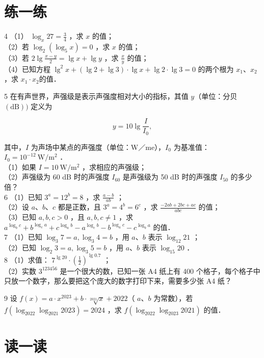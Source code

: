 \documentclass[10pt]{article}
\begin{document}
\section*{练一练}
4 （1） \(\log _{x} 27=\frac{3}{4}\) ，求 \(x\) 的值；\\
（2）若 \(\log _{2}\left(\log _{5} x\right)=0\) ，求 \(x\) 的值；\\
（3）若 \(2 \lg \frac{x-y}{2}=\lg x+\lg y\) ，求 \(\frac{x}{y}\) 的值；\\
（4）已知方程 \(\lg ^{2} x+(\lg 2+\lg 3) \cdot \lg x+\lg 2 \cdot \lg 3=0\) 的两个根为 \(x_{1} 、 x_{2}\) ，求 \(x_{1} \cdot x_{2}\)的值．

5 在有声世界，声强级是表示声强度相对大小的指标，其值 \(y\)（单位：分贝 \((\mathrm{dB}))\) 定义为

\[
y=10 \lg \frac{I}{I_{0}},
\]

其中，\(I\) 为声场中某点的声强度（单位：W／me），\(I_{0}\) 为基准值：\(I_{0}=10^{-12} \mathrm{~W} / \mathrm{m}^{2}\) ．\\
（1）如果 \(I=10 \mathrm{~W} / \mathrm{m}^{2}\) ，求相应的声强级；\\
（2）声强级为 60 dB 时的声强度 \(I_{60}\) 是声强级为 50 dB 时的声强度 \(I_{50}\) 的多少倍？\\
6 （1）已知 \(3^{a}=12^{b}=8\) ，求 \(\frac{a-b}{a b}\) ；\\
（2）设 \(a 、 b 、 c\) 都是正数，且 \(3^{a}=4^{b}=6^{c}\) ，求 \(\frac{-2 a b+2 b c+a c}{a b c}\) 的值；\\
（3）已知 \(a, b, c>0\) ，且 \(a, b, c \neq 1\) ，求 \(a^{\log _{b} c}+b^{\log _{c} a}+c^{\log _{a} b}-a^{\log _{c} b}-b^{\log _{a} c}-c^{\log _{b} a}\) 的值．\\
7 （1）已知 \(\log _{3} 7=a, \log _{3} 4=b\) ，用 \(a 、 b\) 表示 \(\log _{12} 21\) ；\\
（2）已知 \(\log _{2} 3=a, \log _{3} 5=b\) ，用 \(a 、 b\) 表示 \(\log _{15} 20\) ．\\
8 （1）求值： \(7^{\lg 20} \cdot\left(\frac{1}{2}\right)^{\lg 0.7}\) ；\\
（2）实数 \(3^{123456}\) 是一个很大的数，已知一张 A4 纸上有 400 个格子，每个格子中只放一个数字，那么要把这个庞大的数字打印下来，需要多少张 A4 纸？

9 设 \(f(x)=a \cdot x^{2023}+b \cdot \sqrt[2021]{x}+2022\)（ \(a 、 b\) 为常数），若 \(f\left(\log _{2022} \log _{2021} 2023\right)=2024\) ，求 \(f\left(\log _{2022} \log _{2023} 2021\right)\) 的值．

\section*{读一读}
\end{document}
